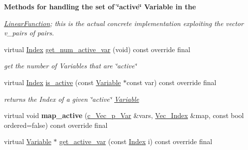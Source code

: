 \begin{Indent}\textbf{ Methods for handling the set of \char`\"{}active\char`\"{} Variable in the}\par
{\em \mbox{\hyperlink{class_s_m_spp__di__unipi__it_1_1_linear_function}{Linear\+Function}}; this is the actual concrete implementation exploiting the vector v\+\_\+pairs of pairs. }\begin{DoxyCompactItemize}
\item 
virtual \mbox{\hyperlink{group___thin_var_dep_interface___c_l_a_s_s_e_s_gad53d6229d7ec28555a9c9c2fd9abf773}{Index}} \mbox{\hyperlink{class_s_m_spp__di__unipi__it_1_1_linear_function_a9e4e36559af1c5c8ecac72598b9fea4c}{get\+\_\+num\+\_\+active\+\_\+var}} (void) const override final
\begin{DoxyCompactList}\small\item\em get the number of Variables that are \char`\"{}active\char`\"{} \end{DoxyCompactList}\item 
virtual \mbox{\hyperlink{group___thin_var_dep_interface___c_l_a_s_s_e_s_gad53d6229d7ec28555a9c9c2fd9abf773}{Index}} \mbox{\hyperlink{class_s_m_spp__di__unipi__it_1_1_linear_function_a11ab803d076414aa34a02d03a4f6db4d}{is\+\_\+active}} (const \mbox{\hyperlink{class_s_m_spp__di__unipi__it_1_1_variable}{Variable}} $\ast$const var) const override final
\begin{DoxyCompactList}\small\item\em returns the Index of a given \char`\"{}active\char`\"{} \mbox{\hyperlink{class_s_m_spp__di__unipi__it_1_1_variable}{Variable}} \end{DoxyCompactList}\item 
\mbox{\label{class_s_m_spp__di__unipi__it_1_1_linear_function_a2c14af2216492af05708e4cd138c0ab0}} 
virtual void {\bfseries map\+\_\+active} (\mbox{\hyperlink{group___variable___t_y_p_e_s_gac0f024c387d6f879e3f8835d86d44bf5}{c\+\_\+\+Vec\+\_\+p\+\_\+\+Var}} \&vars, \mbox{\hyperlink{group___thin_var_dep_interface___c_l_a_s_s_e_s_ga9a1284953e2aa5222b5867c0a7f98499}{Vec\+\_\+\+Index}} \&map, const bool ordered=false) const override final
\item 
virtual \mbox{\hyperlink{class_s_m_spp__di__unipi__it_1_1_variable}{Variable}} $\ast$ \mbox{\hyperlink{class_s_m_spp__di__unipi__it_1_1_linear_function_a2056982790f3293a03f8cebb2f3b0d93}{get\+\_\+active\+\_\+var}} (const \mbox{\hyperlink{group___thin_var_dep_interface___c_l_a_s_s_e_s_gad53d6229d7ec28555a9c9c2fd9abf773}{Index}} i) const override final

\end{DoxyCompactItemize}
\end{Indent}
